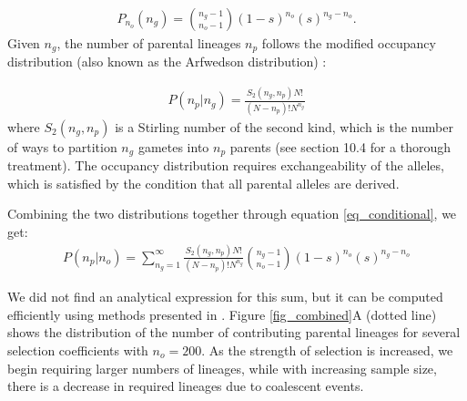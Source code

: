 \documentclass[review,nonatbib]{elsarticle}
\begin{document}
\begin{equation}
  \begin{aligned}
    \label{eq_neg_binomial_trials}
    P_{n_o}(n_g) = \binom{n_g-1}{n_o-1}(1-s)^{n_o}(s)^{n_g-n_o}.
  \end{aligned}
\end{equation}
Given $n_g$, the number of parental lineages $n_p$ follows the modified occupancy distribution
(also known as the Arfwedson distribution) \citep{Wakeley2009,ONeill2019,JohnsonEtAl2005}: 

\begin{equation}
  \begin{aligned}
    \label{eq_occupancy}
    P(n_p|n_g) = \frac{S_2(n_g,n_p) N!}{(N-n_p)! N^{n_g}}
  \end{aligned}
\end{equation}
where $S_2(n_g,n_p)$ is a Stirling number of the second kind, which is the number of ways to
partition $n_g$ gametes into $n_p$ parents (see \cite{JohnsonEtAl2005} section 10.4 for a thorough
treatment).
The occupancy distribution requires exchangeability of the alleles, which is satisfied by the 
condition that all parental alleles are derived. 

Combining the two distributions together through equation \ref{eq_conditional}, we get:
\begin{equation}
  \begin{aligned}
    \label{eq_lineages_in_past}
    P(n_p|n_o) = \sum_{n_g=1}^{\infty} \frac{S_2(n_g,n_p) N!}{(N-n_p)! N^{n_g}} \binom{n_g-1}{n_o-1}(1-s)^{n_o}(s)^{n_g-n_o}
  \end{aligned}
\end{equation}

We did not find an analytical expression for this sum, but it can be computed
efficiently using methods presented in \citep{ONeill2019}. Figure \ref{fig_combined}A (dotted line) shows
the distribution of the number of contributing parental lineages for several selection coefficients
with $n_o=200$.
As the strength of selection
is increased, we begin requiring larger numbers of lineages, while with increasing sample size,
there is a decrease in required lineages due to coalescent events.
\end{document}
